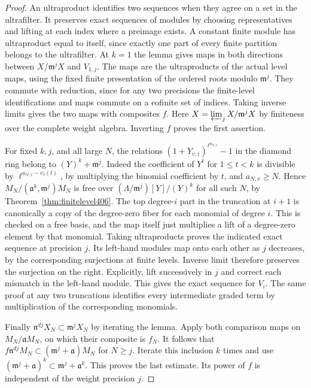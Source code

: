 \documentclass[a4paper,11pt]{article}
\theoremstyle{definition}
\theoremstyle{remark}
\numberwithin{equation}{section}
\begin{document}
\begin{proof}
An ultraproduct identifies two sequences when they agree
on a set in the ultrafilter. It preserves exact sequences
of modules by choosing representatives and lifting at each
index where a preimage exists. A constant finite module
has ultraproduct equal to itself, since exactly one part
of every finite partition belongs to the ultrafilter.
At \(k=1\) the lemma gives maps in both directions between
\(X/\mathfrak m^j X\) and \(V_{1,j}\). The maps are the
ultraproducts of the actual level maps, using the fixed
finite presentation of the ordered roots modulo
\(\mathfrak m^j\). They commute with reduction, since
for any two precisions the finite-level identifications
and maps commute on a cofinite set of indices. Taking inverse
limits gives the two maps with composites \(f\). Here
\(X=\varprojlim_jX/\mathfrak m^jX\) by finiteness over the
complete weight algebra. Inverting \(f\) proves the first
assertion.

For fixed \(k,j\), and all large \(N\), the relations
\((1+Y_{v,i})^{\ell^{a_{N,v}}}-1\) in the diamond ring
belong to \((Y)^k+\mathfrak m^j\). Indeed the coefficient of
\(Y^t\) for \(1\le t<k\) is divisible by
\(\ell^{a_{N,v}-v_\ell(t)}\), by multiplying the binomial
coefficient by \(t\), and \(a_{N,v}\ge N\).
Hence \(M_N/(\mathfrak a^k,\mathfrak m^j)M_N\) is free over
\((\Lambda/\mathfrak m^j)[Y]/(Y)^k\) for all such \(N\),
by Theorem~\ref{thm:finitelevel406}. The top degree-\(i\)
part in the truncation at \(i+1\) is canonically a copy of
the degree-zero fiber for each monomial of degree \(i\).
This is checked on a free basis, and the map itself just
multiplies a lift of a degree-zero element by that monomial.
Taking ultraproducts proves the indicated exact sequence
at precision \(j\). Its left-hand modules map onto each
other as \(j\) decreases, by the corresponding surjections
at finite levels. Inverse limit therefore preserves the
surjection on the right. Explicitly, lift successively in
\(j\) and correct each mismatch in the left-hand module.
This gives the exact sequence for \(V_i\). The same proof
at any two truncations identifies every intermediate
graded term by multiplication of the corresponding monomials.

Finally \(\mathfrak n^{dj}X_N\subset\mathfrak m^j X_N\)
by iterating the lemma. Apply both comparison maps on
\(M_N/\mathfrak aM_N\), on which their composite is \(f_N\).
It follows that \(f\mathfrak n^{dj}M_N\subset
(\mathfrak m^j+\mathfrak a)M_N\) for \(N\ge j\).
Iterate this inclusion \(k\) times and use
\((\mathfrak m^j+\mathfrak a)^k\subset\mathfrak m^j+\mathfrak a^k\).
This proves the last estimate. Its power of \(f\) is
independent of the weight precision \(j\).
\end{proof}
\end{document}
